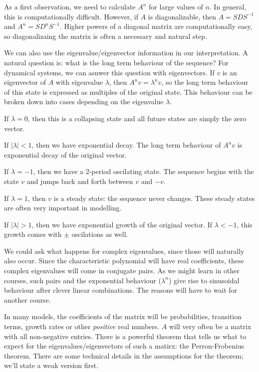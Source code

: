 \documentclass[fleqn]{report}
\begin{document}
As a first observation, we need to calculate $A^n$ for large
values of $n$. In general, this is computationally difficult.
However, if $A$ is diagonalizable, then $A = SDS^{-1}$ and
$A^n = SD^nS^{-1}$. Higher powers of a diagonal matrix are
computationally easy, so diagonalizaing the matrix is often a
necessary and natural step.

We can also use the eigenvalue/eigenvector information in our
interpretation. A natural question is: what is the long term
behaviour of the sequence? For dynamical systems, we can
asnwer this question with eigenvectors. If $v$ is an
eigenvector of $A$ with eigenvalue $\lambda$, then $A^n v =
\lambda^n v$, so the long term behaviour of this state is
expressed as multiples of the original state. This behaviour
can be broken down into cases depending on the eigenvalue
$\lambda$.

\begin{smallitemize}
\item If $\lambda = 0$, then this is a collapsing state and
all future states are simply the zero vector.
\item If $|\lambda| < 1$, then we have exponential decay. The
long term behaviour of $A^n v$ is exponential decay
of the original vector.
\item If $\lambda = -1$, then we have a 2-period oscilating
state. The sequence begins with the state $v$ and jumps back
and forth between $v$ and $-v$.
\item If $\lambda = 1$, then $v$ is a steady state: the
sequence never changes. These steady states are often very
important in modelling.
\item If $|\lambda| > 1$, then we have exponential growth
of the original vector. If $\lambda < -1$, this
growth comes with $\pm$ oscilations as well.
\end{smallitemize}

We could ask what happens for complex eigenvalues, since
those will naturally also occur. Since the characteristic
polynomial will have real coefficients, these complex
eigenvalues will come in conjugate pairs. As we might learn
in other courses, such pairs and the exponential behaviour
($\lambda^n$) give rise to sinusoidal behaviour after clever
linear combinations. The reasons will have to wait for
another course.

In many models, the coefficients of the matrix will be
probabilities, transition terms, growth rates or other
\emph{positive} real numbers. $A$ will very often be a matrix
with all non-negative entries. There is a powerful theorem
that tells us what to expect for the eigenvalues/eigenvectors
of such a matirx: the Perron-Frobenius theorem. There are
some technical details in the assumptions for the theorem;
we'll state a weak version first.
\end{document}
